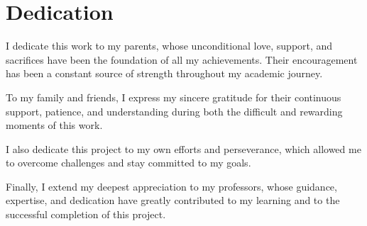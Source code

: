 \chapter*{Dedication}

I dedicate this work to my parents, whose unconditional love, support, and sacrifices have been the foundation of all my achievements. Their encouragement has been a constant source of strength throughout my academic journey.

To my family and friends, I express my sincere gratitude for their continuous support, patience, and understanding during both the difficult and rewarding moments of this work.

I also dedicate this project to my own efforts and perseverance, which allowed me to overcome challenges and stay committed to my goals.

Finally, I extend my deepest appreciation to my professors, whose guidance, expertise, and dedication have greatly contributed to my learning and to the successful completion of this project.